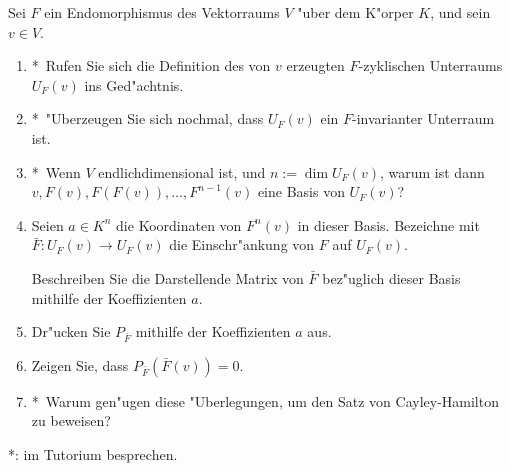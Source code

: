 \documentclass[a4,11pt]{article}
\begin{document}
\begin{aufgabe}[4 Punkte]
Sei $F$ ein Endomorphismus des Vektorraums $V$ "uber dem K"orper $K$,
und sein $v \in V$.

\newcommand{\bonusitem}{\item\hspace*{-2.4mm}*\ }

  \begin{enumerate}
  \bonusitem Rufen Sie sich die Definition des von $v$ erzeugten
    $F$-zyklischen Unterraums $U_F(v)$ ins Ged"achtnis.
  \bonusitem "Uberzeugen Sie sich nochmal, dass $U_F(v)$ ein
    $F$-invarianter Unterraum ist.
  \bonusitem Wenn $V$ endlichdimensional ist, und $n := \dim U_F(v)$, warum
    ist dann \\ $v, F(v), F(F(v)), \ldots, F^{n-1}(v)$ eine
    Basis von $U_F(v)$?
  \item Seien $a \in K^n$ die Koordinaten von $F^n(v)$ in dieser Basis.
    Bezeichne mit \\ $\bar F \colon U_F(v) \to U_F(v)$ die 
    Einschr"ankung von $F$ auf $U_F(v)$.
    
    Beschreiben Sie die Darstellende Matrix von $\bar F$ bez"uglich
    dieser Basis mithilfe der Koeffizienten $a$.
  \item Dr"ucken Sie $P_{\bar F}$ mithilfe der Koeffizienten $a$ aus.
  \item Zeigen Sie, dass $P_{\bar F}(\bar F(v)) = 0$.
  \bonusitem Warum gen"ugen diese "Uberlegungen, um den Satz von
    Cayley-Hamilton zu beweisen?
\end{enumerate}

*: im Tutorium besprechen.
\end{aufgabe}
\end{document}
